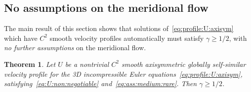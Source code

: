 \documentclass[11pt,reqno]{amsproc}
\numberwithin{equation}{section}
\newtheorem{theorem}{Theorem}[section]
\theoremstyle{remark}
\begin{document}
\subsection{No assumptions on the meridional flow}
The main result of this section shows that  solutions of~\eqref{eq:profile:U:axisym} which have $C^2$ smooth velocity profiles automatically must satisfy $\gamma \geq 1/2$, with \emph{no further assumptions} on the meridional flow.

\begin{theorem}
\label{thm:axisym:final}
Let $U$ be a nontrivial $C^2$ smooth axisymmetric globally self-similar velocity profile for the 3D incompressible Euler equations~\eqref{eq:profile:U:axisym}, satisfying~\eqref{eq:U:non:negotiable} and~\eqref{eq:ass:medium:rare}.  Then $\gamma \geq 1/2$. 
\end{theorem}
\end{document}
